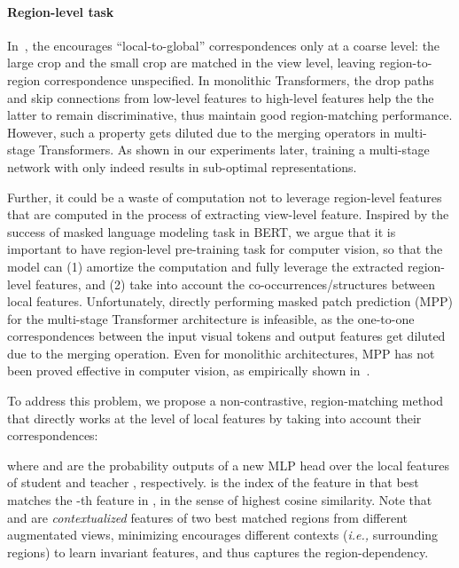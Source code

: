 \documentclass{article} \usepackage{iclr2022_conference,times}
\newcommand{\ie}[0]{\emph{i.e., }}
\begin{document}
\paragraph{Region-level task}
In~\citep{caron2021emerging}, the  encourages ``local-to-global'' correspondences only at a coarse level: the large crop and the small crop are matched in the view level, leaving region-to-region correspondence unspecified. In monolithic Transformers, the drop paths and skip connections from low-level features to high-level features help the the latter to remain discriminative, thus maintain good region-matching performance. However, such a property gets diluted due to the merging operators in multi-stage Transformers. As shown in our experiments later, training a multi-stage network with  only indeed results in sub-optimal representations. 

Further, it could be a waste of computation not to leverage region-level features  that are computed in the process of extracting view-level feature.
Inspired by the success of masked language modeling task in BERT, we argue that it is important to have region-level pre-training task for computer vision, so that the model can (1) amortize the computation and fully leverage the extracted region-level features, and (2) take into account the co-occurrences/structures between local features. Unfortunately, directly performing masked patch
prediction (MPP) for the multi-stage Transformer architecture is infeasible, as the one-to-one correspondences between the input visual tokens and output features get diluted due to the merging operation. Even for monolithic architectures, MPP has not been proved effective in computer vision, as empirically shown in~\citep{dosovitskiy2020image}.

\label{sec:correspondence_imagenet}


To address this problem, we propose a non-contrastive, region-matching method
that directly works at the level of local features
by taking into account their correspondences:

where 
 and  are the probability outputs of a new MLP head  over the local features of student  and teacher , respectively.  is the index of the feature in  that best matches the -th feature in , in the sense of highest cosine similarity. Note that  and  are {\em contextualized} features of two best matched regions from different augmentated views, minimizing  encourages different contexts (\ie surrounding regions) to learn invariant features, and thus captures the region-dependency.
\end{document}
